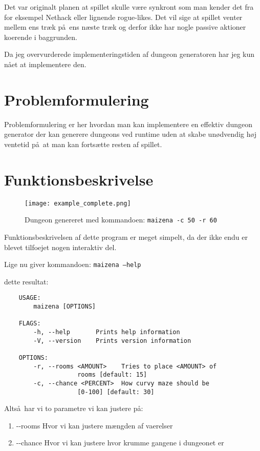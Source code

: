 \documentclass[12pt]{article}
\begin{document}
Det var originalt planen at spillet skulle v\ae re synkront som man kender det fra for eksempel Nethack eller lignende rogue-likes. Det vil sige at spillet venter mellem ens tr\ae k p\aa\ ens n\ae ste tr\ae k og derfor ikke har nogle passive aktioner koerende i baggrunden.

Da jeg overvurderede implementeringstiden af dungeon generatoren har jeg kun n\aa et at implementere den.

\section{Problemformulering}

Problemformulering er her hvordan man kan implementere en effektiv dungeon generator der kan generere dungeons ved runtime uden at skabe un\o dvendig h\o j ventetid p\aa\ at man kan forts\ae tte resten af spillet.

\vfill
\pagebreak

\section{Funktionsbeskrivelse}

\begin{figure}[h]
	\centering
	\texttt{[image: example\_complete.png]}
	\caption{Dungeon genereret med kommandoen: \texttt{maizena -c 50 -r 60}}
\end{figure}


Funktionsbeskrivelsen af dette program er meget simpelt, da der ikke endu er blevet tilfoejet nogen interaktiv del.

Lige nu giver kommandoen: \texttt{maizena --help}

dette resultat:

\begin{verbatim}
	USAGE:
	    maizena [OPTIONS]

	FLAGS:
	    -h, --help       Prints help information
	    -V, --version    Prints version information

	OPTIONS:
		-r, --rooms <AMOUNT>    Tries to place <AMOUNT> of
					rooms [default: 15]
		-c, --chance <PERCENT>  How curvy maze should be
					[0-100] [default: 30]
\end{verbatim}

Alts\aa\ har vi to parametre vi kan justere p\aa:

\begin{enumerate}
	\item -{}-rooms Hvor vi kan justere m\ae ngden af vaerelser
	\item -{}-chance Hvor vi kan justere hvor krumme gangene i dungeonet er
\end{enumerate}
\end{document}
